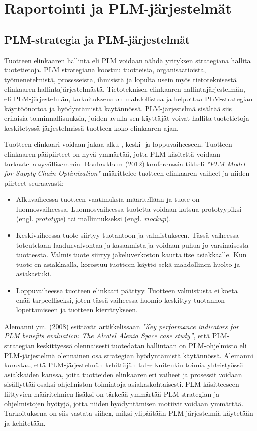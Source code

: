 \chapter{Raportointi ja PLM-järjestelmät} \label{Raportointi ja PLM järjestelmät}

\section{PLM-strategia ja PLM-järjestelmät} \label{PLM-strategia ja PLM-järjestelmät}

Tuotteen elinkaaren hallinta eli PLM voidaan nähdä yrityksen strategiana hallita tuotetietoja. PLM strategiana koostuu tuotteista, organisaatioista, työmenetelmistä, prosesseista, ihmisistä ja lopulta usein myös tietoteknisestä elinkaaren hallintajärjestelmästä. Tietoteknisen elinkaaren hallintajärjestelmän, eli PLM-järjestelmän, tarkoituksena on mahdollistaa ja helpottaa PLM-strategian käyttöönottoa ja hyödyntämistä käytännössä. PLM-järjestelmä sisältää siis erilaisia toiminnallisuuksia, joiden avulla sen käyttäjät voivat hallita tuotetietoja keskitetyssä järjestelmässä tuotteen koko elinkaaren ajan.

Tuotteen elinkaari voidaan jakaa alku-, keski- ja loppuvaiheeseen. Tuotteen elinkaaren pääpiirteet on hyvä ymmärtää, jotta PLM-käsitettä voidaan tarkastella syvällisemmin. Bouhaddoun (2012) konferenssiartikkeli \textit{"PLM Model for Supply Chain Optimization"} määrittelee tuotteen elinkaaren vaiheet ja niiden piirteet seuraavasti:  \cite{bouhaddou_plm_2012}
\begin{itemize}
\item Alkuvaiheessa tuotteen vaatimuksia määritellään ja tuote on luonnosvaiheessa. Luonnosvaiheessa tuotetta voidaan kutsua prototyypiksi (engl. \textit{prototype}) tai mallinnukseksi (engl. \textit{mockup}).
\item Keskivaiheessa tuote siirtyy tuotantoon ja valmistukseen. Tässä vaiheessa toteutetaan laadunvalvontaa ja kasaamista ja voidaan puhua jo varsinaisesta tuotteesta. Valmis tuote siirtyy jakeluverkoston kautta itse asiakkaalle. Kun tuote on asiakkaalla, korostuu tuotteen käyttö sekä mahdollinen huolto ja asiakastuki.
\item Loppuvaiheessa tuotteen elinkaari päättyy. Tuotteen valmistusta ei koeta enää tarpeelliseksi, joten tässä vaiheessa huomio keskittyy tuotannon lopettamiseen ja tuotteen kierrätykseen.
\end{itemize}
Alemanni ym. (2008) esittävät artikkelissaan \textit{"Key performance indicators for PLM benefits evaluation: The Alcatel Alenia Space case study”}, että PLM-strategian keskittyessä olennaisesti tuotedatan hallintaan on PLM-ohjelmisto eli PLM-järjestelmä olennainen osa strategian hyödyntämistä käytännössä.  \cite{alemanni_key_2008} Alemanni korostaa, että PLM-järjestelmän kehittäjän tulee kuitenkin toimia yhteistyössä asiakkaiden kanssa, jotta tuotteiden elinkaaren eri vaiheet ja prosessit voidaan sisällyttää osaksi ohjelmiston toimintoja asiakaskohtaisesti. PLM-käsitteeseen liittyvien määritelmien lisäksi on tärkeää ymmärtää PLM-strategian ja -ohjelmistojen hyötyjä, jotta niiden hyödyntämisen motiivit voidaan ymmärtää. Tarkoituksena on siis vastata siihen, miksi ylipäätään PLM-järjestelmiä käytetään ja kehitetään.

